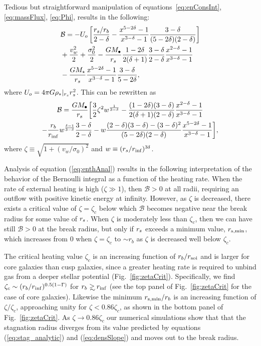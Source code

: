 Tedious but straightforward manipulation of equations~\eqref{eq:enConsInt}, \eqref{eq:massFlux}, \eqref{eq:Phi}, results in the following:
\begin{align}
  &\mathcal{B} = -U_o\left[\frac{r_s/r_b}{2-\delta}-\frac{x^{5-2\delta}-1}{x^{3-\delta}-1}\frac{3-\delta}{(5-2\delta)(2-\delta)}\right]\nonumber\\
  &+\frac{v_w^2}{2}+\frac{\sigma_0^2}{2}- \frac{G M_{\bullet}}{r_s}
  \frac{1-2\delta}{2(\delta+1)}
  \frac{3-\delta}{2-\delta}\frac{x^{2-\delta}-1}{x^{3-\delta}-1}
  \nonumber\\
  &-\frac{G M_\star}{r_s}
  \frac{x^{5-2\delta}-1}{x^{3-\delta}-1}\frac{3-\delta}{5-2\delta},
\end{align}
where $U_o=4 \pi G \rho_*|_{r_s} r_s^2$.  This can be rewritten as
\begin{multline}
  \mathcal{B} =\frac{G M_{\bullet}}{r_s} \biggl[ \frac{3}{2} \zeta^2
  w^{\frac{1}{3 -\delta}}
  -\frac{(1-2\delta)(3-\delta)}{2(\delta+1)(2-\delta)}  \frac{x^{2  -\delta}-1}{x^{3-\delta}-1}\\
  -\frac{r_b}{r_{\rm inf}} w^{\frac{\delta-1}{3-\delta}} \frac{3 -\delta}{2
    -\delta} -w
  \frac{(2-\delta)(3-\delta)-(3-\delta)^{2}}{(5-2\delta)(2-\delta)}
  \frac{x^{5-2\delta}-1}{x^{3-\delta}-1} \biggr],
\label{eq:enthAnal}
\end{multline}
where $\zeta \equiv \sqrt{1 + (v_w/\sigma_0)^2}$ and $w\equiv
(r_s/r_{\rm inf})^{3\delta}$.

Analysis of equation (\ref{eq:enthAnal}) results in the following
interpretation of the behavior of the Bernoulli integral as a function
of the heating rate.  When the rate of external heating is high
($\zeta \gg 1$), then $\mathcal{B} > 0$ at all radii, requiring an
outflow with positive kinetic energy at infinity.  However, as $\zeta$
is decreased, there exists a critical value of $\zeta = \zeta_{c}$
below which $\mathcal{B}$ becomes negative near the break radius for
some value of $r_s$.  When $\zeta$ is moderately less than $\zeta_c$,
then we can have still $\mathcal{B} > 0$ at the break radius, but only
if $r_s$ exceeds a minimum value, $r_{\rm s,min}$, which increases
from 0 when $\zeta = \zeta_c$ to $\sim r_{b}$ as $\zeta$ is decreased
well below $\zeta_c$.

The critical heating value $\zeta_c$ is an increasing function of
$r_{b}/r_{\rm soi}$ and is larger for core galaxies than cusp
galaxies, since a greater heating rate is required to unbind gas from
a deeper stellar potential (Fig.~\ref{fig:zetaCrit}).  Specifically,
we find $\zeta_c\sim (r_b/r_{\rm inf})^{0.5(1-\Gamma)}$ for $\rb\gsim\rsoi$
(see the top panel of Fig.~\ref{fig:zetaCrit} for the case of core
galaxies). Likewise the minimum $r_{\rm s,min}/r_{b}$ is an increasing
function of $\zeta/\zeta_{c}$, approaching unity for $\zeta <
0.86\zeta_c$, as shown in the bottom panel of Fig.~\ref{fig:zetaCrit}.
As $\zeta \rightarrow 0.86\zeta_c$ our numerical simulations show that
that the stagnation radius diverges from its value predicted by
equations (\ref{eq:stag_analytic}) and (\ref{eq:densSlope}) and moves
out to the break radius.


